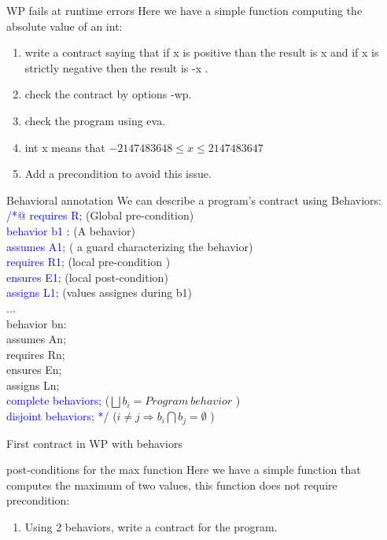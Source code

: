 \begin{frame}{WP fails at runtime errors}
Here we have a simple function computing the absolute value of an int:

\begin{enumerate}
	\item write a contract saying that if x is positive than the result is x and if x is strictly negative then the result is -x .
	\item check the contract by options -wp.
	\item check the program using eva.
	\pause
	\item int x means that $-2147483648\leq x \leq 2147483647$
	\item Add a precondition to avoid this issue.
	
\end{enumerate}
\end{frame}
\begin{frame} {Behavioral annotation}
We can describe a program's contract using Behaviors:\\
\textcolor{blue}{/*@ requires R;}   (Global pre-condition)\\
\textcolor{blue}{    behavior b1 :}      (A behavior) \\
\textcolor{blue}{assumes A1; }      ( a guard characterizing the behavior)\\
\textcolor{blue}{requires R1; }     (local pre-condition )\\
\textcolor{blue}{ensures E1;  }     (local post-condition)\\
\textcolor{blue}{assigns L1; }      (values assignes during b1)\\
...               \\
behavior bn:    \\
assumes An;    \\
requires Rn;   \\
ensures En;    \\
assigns Ln;     \\

\textcolor{blue}{complete behaviors; }   ($\bigsqcup b_i = Program~ behavior$ )\\ 
\textcolor{blue}{disjoint behaviors; */}  ($ i\neq j \Rightarrow b_i \bigcap b_j =  \emptyset$ ) 
\end{frame}

\begin{frame}{First contract in WP with behaviors}
\begin{exampleblock}{post-conditions for  the max function}
	Here we have a simple function that computes the maximum of two values, this function does not require precondition:
	
	\begin{enumerate}
		\item Using 2 behaviors, write a contract for the program.
	
	\end{enumerate}
\end{exampleblock}
\end{frame}

